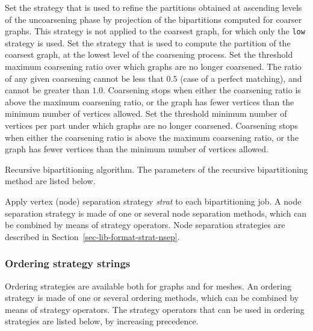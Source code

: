 \begin{itemize}
\begin{itemize}
\iteme[{\tt asc=}{\it strat}]
Set the strategy that is used to refine the partitions obtained
at ascending levels of the uncoarsening phase by projection of the
bipartitions computed for coarser graphs.
This strategy is not applied to the coarsest graph, for which only the
{\tt low} strategy is used.
\iteme[{\tt low=}{\it strat}]
Set the strategy that is used to compute the partition of the
coarsest graph, at the lowest level of the coarsening process.
\iteme[{\tt rat=}{\it rat}]
Set the threshold maximum coarsening ratio over which graphs are no longer
coarsened. The ratio of any given coarsening cannot be less that $0.5$
(case of a perfect matching), and cannot be greater than $1.0$.
Coarsening stops when either the coarsening ratio is above the maximum
coarsening ratio, or the graph has fewer vertices than the minimum number of
vertices allowed.
\iteme[{\tt vert=}{\it nbr}]
Set the threshold minimum number of vertices per part under which
graphs are no longer coarsened. Coarsening stops when either the
coarsening ratio is above the maximum coarsening ratio, or the graph
has fewer vertices than the minimum number of vertices allowed.
\end{itemize}
\iteme[{\tt r}]
Recursive bipartitioning algorithm. The parameters of the recursive
bipartitioning method are listed below.
\begin{itemize}
\iteme[{\tt sep=}{\it strat}]
Apply vertex (node) separation strategy {\it strat\/} to each
bipartitioning job. A node separation strategy is made of one or
several node separation methods, which can be combined by means of
strategy operators. Node separation strategies are described in
Section~\ref{sec-lib-format-strat-nsep}.
\end{itemize}
\end{itemize}

\subsubsection{Ordering strategy strings}
\label{sec-lib-format-strat-ord}

Ordering strategies are available both for graphs and for meshes.
An ordering strategy is made of one or several ordering methods, which
can be combined by means of strategy operators. The strategy
operators that can be used in ordering strategies are listed below, by
increasing precedence.


